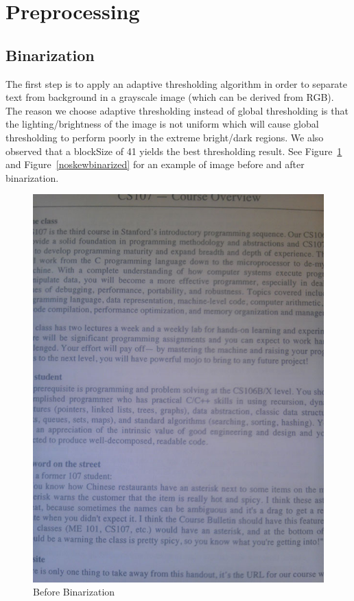 \documentclass[conference]{IEEEtran}
\begin{document}
\section{Preprocessing}
\subsection{Binarization}

The first step is to apply an adaptive thresholding algorithm in order to separate text from background in a grayscale image (which can be derived from RGB).  The reason we choose adaptive thresholding instead of global thresholding is that the lighting/brightness of the image is not uniform which will cause global thresholding to perform poorly in the extreme bright/dark regions.  We also observed that a blockSize of 41 yields the best thresholding result.  See Figure~\ref{noskew} and Figure~\ref{noskewbinarized} for an example of image before and after binarization.

\begin{figure}
\center
\includegraphics[scale=0.25]{no_skew.jpg}
\caption{Before Binarization}
\label{noskew}
\end{figure}
\end{document}
